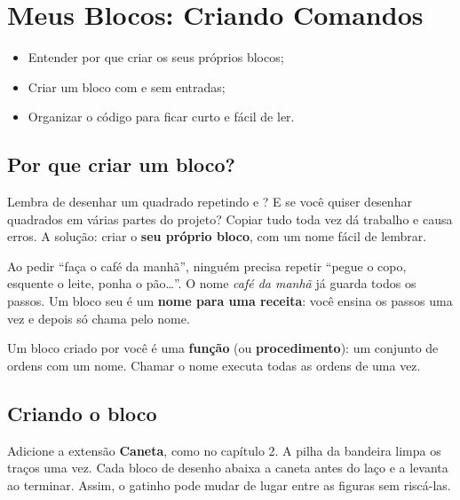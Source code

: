 \chapter{Meus Blocos: Criando Comandos}

\begin{objetivos}
\begin{itemize}
\item Entender por que criar os seus próprios blocos;
\item Criar um bloco com e sem entradas;
\item Organizar o código para ficar curto e fácil de ler.
\end{itemize}
\end{objetivos}

\section{Por que criar um bloco?}

Lembra de desenhar um quadrado repetindo  e ? E se você quiser desenhar quadrados em várias partes do projeto? Copiar tudo toda vez dá trabalho e causa erros. A solução: criar o \textbf{seu próprio bloco}, com um nome fácil de lembrar.

\begin{pensaassim}
Ao pedir ``faça o café da manhã'', ninguém precisa repetir ``pegue o copo, esquente o leite, ponha o pão\ldots''. O nome \emph{café da manhã} já guarda todos os passos. Um bloco seu é um \textbf{nome para uma receita}: você ensina os passos uma vez e depois só chama pelo nome.
\end{pensaassim}

\begin{vocabulario}
Um bloco criado por você é uma \textbf{função} (ou \textbf{procedimento}): um conjunto de ordens com um nome. Chamar o nome executa todas as ordens de uma vez.
\end{vocabulario}

\section{Criando o bloco}

Adicione a extensão \textbf{Caneta}, como no capítulo 2. A pilha da bandeira limpa os traços uma vez. Cada bloco de desenho abaixa a caneta antes do laço e a levanta ao terminar. Assim, o gatinho pode mudar de lugar entre as figuras sem riscá-las.

